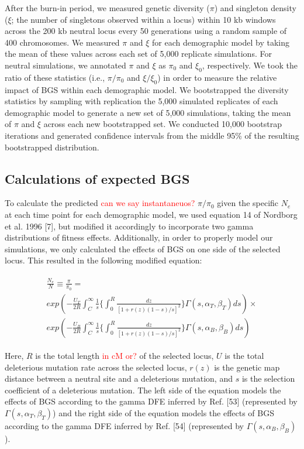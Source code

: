 \documentclass[9pt,twocolumn,twoside]{rilabRxiv}
\newcommand{\jri}[1]{{\small \textcolor{red}{#1}}}
\begin{document}
After the burn-in period, we measured genetic diversity ($\pi$) and singleton density ($\xi$; the number of singletons observed within a locus) within 10 kb windows across the 200 kb neutral locus every 50 generations using a random sample of 400 chromosomes.
We measured $\pi$ and $\xi$ for each demographic model by taking the mean of these values across each set of 5,000 replicate simulations.
For neutral simulations, we annotated $\pi$ and $\xi$ as $\pi_0$ and $\xi_0$, respectively.
We took the ratio of these statistics (i.e., $\pi/\pi_0$ and $\xi/\xi_0$) in order to measure the relative impact of BGS within each demographic model.
We bootstrapped the diversity statistics by sampling with replication the 5,000 simulated replicates of each demographic model to generate a new set of 5,000 simulations, taking the mean of $\pi$ and $\xi$ across each new bootstrapped set.
We conducted 10,000 bootstrap iterations and generated confidence intervals from the middle 95\% of the resulting bootstrapped distribution.

\subsection{Calculations of expected BGS}

To calculate the predicted \jri{can we say instantaneuos?} $\pi/\pi_0$ given the specific $N_e$ at each time point for each demographic model, we used equation 14 of Nordborg et al. 1996 [7], but modified it accordingly to incorporate two gamma distributions of fitness effects.
Additionally, in order to properly model our simulations, we only calculated the effects of BGS on one side of the selected locus.
This resulted in the following modified equation:


\begin{eqnarray*}
\begin{aligned}
\frac{N_e}{N}\equiv\frac{\pi}{\pi_0}= \\
exp\left( -\frac{U_T}{2R}\int^{\infty}_C\frac{1}{s}\bigg\{\int_0^R\frac{dz}{[1+r(z)(1-s)/s]^2}\bigg\}\Gamma(s,\alpha_T,\beta_T)ds \right)\times \\
    exp\left( -\frac{U_B}{2R}\int^{\infty}_C\frac{1}{s}\bigg\{\int_0^R\frac{dz}{[1+r(z)(1-s)/s]^2}\bigg\}\Gamma(s,\alpha_B,\beta_B)ds \right)
    \end{aligned}
\end{eqnarray*}

Here, $R$ is the total length \jri{in cM or?} of the selected locus, $U$ is the total deleterious mutation rate across the selected locus, $r(z)$ is the genetic map distance between a neutral site and a deleterious mutation, and $s$ is the selection coefficient of a deleterious mutation.
The left side of the equation models the effects of BGS according to the gamma DFE inferred by Ref. [53] (represented by $\Gamma(s,\alpha_T,\beta_T)$) and the right side of the equation models the effects of BGS according to the gamma DFE inferred by Ref. [54] (represented by $\Gamma(s,\alpha_B,\beta_B)$).
\end{document}
